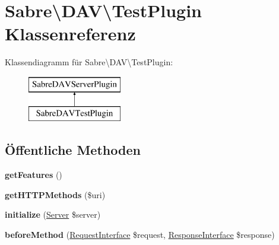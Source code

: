 \hypertarget{class_sabre_1_1_d_a_v_1_1_test_plugin}{}\section{Sabre\textbackslash{}D\+AV\textbackslash{}Test\+Plugin Klassenreferenz}
\label{class_sabre_1_1_d_a_v_1_1_test_plugin}
Klassendiagramm für Sabre\textbackslash{}D\+AV\textbackslash{}Test\+Plugin\+:\begin{figure}[H]
\begin{center}
\leavevmode
\includegraphics[height=2.000000cm]{class_sabre_1_1_d_a_v_1_1_test_plugin}
\end{center}
\end{figure}
\subsection*{Öffentliche Methoden}
\begin{DoxyCompactItemize}
\item 
\mbox{\label{class_sabre_1_1_d_a_v_1_1_test_plugin_acef01fb33714ae865b0f3c6d71bebef8}} 
{\bfseries get\+Features} ()
\item 
\mbox{\label{class_sabre_1_1_d_a_v_1_1_test_plugin_a146cf6bcb2d49a539d8a09905bb55c9f}} 
{\bfseries get\+H\+T\+T\+P\+Methods} (\$uri)
\item 
\mbox{\label{class_sabre_1_1_d_a_v_1_1_test_plugin_a9f68f29ab216fd7372dde51f50f1b94c}} 
{\bfseries initialize} (\mbox{\hyperlink{class_sabre_1_1_d_a_v_1_1_server}{Server}} \$server)
\item 
\mbox{\label{class_sabre_1_1_d_a_v_1_1_test_plugin_ae389774a713fa783d50e178c17ba16bc}} 
{\bfseries before\+Method} (\mbox{\hyperlink{interface_sabre_1_1_h_t_t_p_1_1_request_interface}{Request\+Interface}} \$request, \mbox{\hyperlink{interface_sabre_1_1_h_t_t_p_1_1_response_interface}{Response\+Interface}} \$response)
\end{DoxyCompactItemize}
